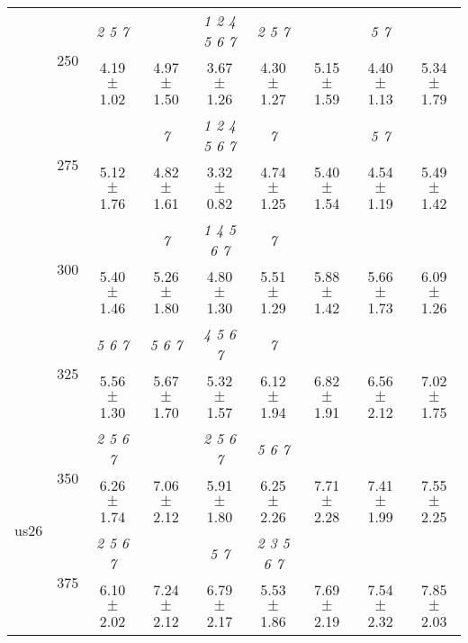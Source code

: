 \begin{table}[h]
{\begin{tabular}{
        ccccccccc}
 & \multirow{2}{*}{250}& \textit{ 2 5 7 }& & \textit{ 1 2 4 5 6 7 }& \textit{ 2 5 7 }& & \textit{ 5 7 }&  \\ 
 & & 4.19 $\pm$ 1.02& 4.97 $\pm$ 1.50& 3.67 $\pm$ 1.26& 4.30 $\pm$ 1.27& 5.15 $\pm$ 1.59& 4.40 $\pm$ 1.13& 5.34 $\pm$ 1.79 \\ 
 & \multirow{2}{*}{275}& \cellcolor[HTML]{EFEFEF} & \cellcolor[HTML]{EFEFEF} \textit{ 7 }& \cellcolor[HTML]{EFEFEF} \textit{ 1 2 4 5 6 7 }& \cellcolor[HTML]{EFEFEF} \textit{ 7 }& \cellcolor[HTML]{EFEFEF} & \cellcolor[HTML]{EFEFEF} \textit{ 5 7 }& \cellcolor[HTML]{EFEFEF}  \\ 
 & & \cellcolor[HTML]{EFEFEF} 5.12 $\pm$ 1.76& \cellcolor[HTML]{EFEFEF} 4.82 $\pm$ 1.61& \cellcolor[HTML]{EFEFEF} 3.32 $\pm$ 0.82& \cellcolor[HTML]{EFEFEF} 4.74 $\pm$ 1.25& \cellcolor[HTML]{EFEFEF} 5.40 $\pm$ 1.54& \cellcolor[HTML]{EFEFEF} 4.54 $\pm$ 1.19& \cellcolor[HTML]{EFEFEF} 5.49 $\pm$ 1.42 \\ 
 & \multirow{2}{*}{300}& & \textit{ 7 }& \textit{ 1 4 5 6 7 }& \textit{ 7 }& & &  \\ 
 & & 5.40 $\pm$ 1.46& 5.26 $\pm$ 1.80& 4.80 $\pm$ 1.30& 5.51 $\pm$ 1.29& 5.88 $\pm$ 1.42& 5.66 $\pm$ 1.73& 6.09 $\pm$ 1.26 \\ 
 & \multirow{2}{*}{325}& \cellcolor[HTML]{EFEFEF} \textit{ 5 6 7 }& \cellcolor[HTML]{EFEFEF} \textit{ 5 6 7 }& \cellcolor[HTML]{EFEFEF} \textit{ 4 5 6 7 }& \cellcolor[HTML]{EFEFEF} \textit{ 7 }& \cellcolor[HTML]{EFEFEF} & \cellcolor[HTML]{EFEFEF} & \cellcolor[HTML]{EFEFEF}  \\ 
 & & \cellcolor[HTML]{EFEFEF} 5.56 $\pm$ 1.30& \cellcolor[HTML]{EFEFEF} 5.67 $\pm$ 1.70& \cellcolor[HTML]{EFEFEF} 5.32 $\pm$ 1.57& \cellcolor[HTML]{EFEFEF} 6.12 $\pm$ 1.94& \cellcolor[HTML]{EFEFEF} 6.82 $\pm$ 1.91& \cellcolor[HTML]{EFEFEF} 6.56 $\pm$ 2.12& \cellcolor[HTML]{EFEFEF} 7.02 $\pm$ 1.75 \\ 
 \multirow{4}{*}{us26} & \multirow{2}{*}{350}& \textit{ 2 5 6 7 }& & \textit{ 2 5 6 7 }& \textit{ 5 6 7 }& & &  \\ 
 & & 6.26 $\pm$ 1.74& 7.06 $\pm$ 2.12& 5.91 $\pm$ 1.80& 6.25 $\pm$ 2.26& 7.71 $\pm$ 2.28& 7.41 $\pm$ 1.99& 7.55 $\pm$ 2.25 \\ 
 & \multirow{2}{*}{375}& \cellcolor[HTML]{EFEFEF} \textit{ 2 5 6 7 }& \cellcolor[HTML]{EFEFEF} & \cellcolor[HTML]{EFEFEF} \textit{ 5 7 }& \cellcolor[HTML]{EFEFEF} \textit{ 2 3 5 6 7 }& \cellcolor[HTML]{EFEFEF} & \cellcolor[HTML]{EFEFEF} & \cellcolor[HTML]{EFEFEF}  \\ 
 & & \cellcolor[HTML]{EFEFEF} 6.10 $\pm$ 2.02& \cellcolor[HTML]{EFEFEF} 7.24 $\pm$ 2.12& \cellcolor[HTML]{EFEFEF} 6.79 $\pm$ 2.17& \cellcolor[HTML]{EFEFEF} 5.53 $\pm$ 1.86& \cellcolor[HTML]{EFEFEF} 7.69 $\pm$ 2.19& \cellcolor[HTML]{EFEFEF} 7.54 $\pm$ 2.32& \cellcolor[HTML]{EFEFEF} 7.85 $\pm$ 2.03 \\ 

\end{tabular}}
\end{table}
